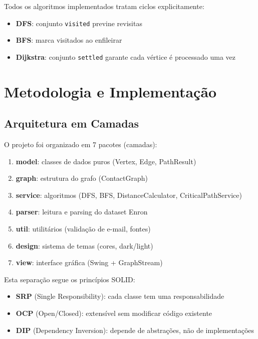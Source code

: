\documentclass[12pt,openright,twoside,a4paper,english,brazilian,hidelinks]{abntex2}
\begin{document}
    Todos os algoritmos implementados tratam ciclos explicitamente:

    \begin{itemize}
        \item \textbf{DFS}: conjunto \texttt{visited} previne revisitas
        \item \textbf{BFS}: marca visitados ao enfileirar
        \item \textbf{Dijkstra}: conjunto \texttt{settled} garante cada vértice é processado uma vez
    \end{itemize}


    \chapter{Metodologia e Implementação}

    \section{Arquitetura em Camadas}

    O projeto foi organizado em 7 pacotes (camadas):

    \begin{enumerate}
        \item \textbf{model}: classes de dados puros (Vertex, Edge, PathResult)
        \item \textbf{graph}: estrutura do grafo (ContactGraph)
        \item \textbf{service}: algoritmos (DFS, BFS, DistanceCalculator, CriticalPathService)
        \item \textbf{parser}: leitura e parsing do dataset Enron
        \item \textbf{util}: utilitários (validação de e-mail, fontes)
        \item \textbf{design}: sistema de temas (cores, dark/light)
        \item \textbf{view}: interface gráfica (Swing + GraphStream)
    \end{enumerate}

    Esta separação segue os princípios SOLID:

    \begin{itemize}
        \item \textbf{SRP} (Single Responsibility): cada classe tem uma responsabilidade
        \item \textbf{OCP} (Open/Closed): extensível sem modificar código existente
        \item \textbf{DIP} (Dependency Inversion): depende de abstrações, não de implementações
    \end{itemize}
\end{document}
